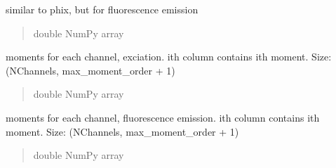 \documentclass[letterpaper,10pt,english]{sphinxmanual}
\begin{document}
\begin{fulllineitems}

\begin{fulllineitems}
\label{\detokenize{_autosummary/nirfasterff.base.data.flTRMomentsdata:nirfasterff.base.data.flTRMomentsdata.phifl}}
\pysigstartsignatures
{}
\pysigstopsignatures
\sphinxAtStartPar
similar to phix, but for fluorescence emission
\begin{quote}\begin{description}
\sphinxAtStartPar
double NumPy array

\end{description}\end{quote}

\end{fulllineitems}


\begin{fulllineitems}
\label{\detokenize{_autosummary/nirfasterff.base.data.flTRMomentsdata:nirfasterff.base.data.flTRMomentsdata.momentsx}}
\pysigstartsignatures
{}
\pysigstopsignatures
\sphinxAtStartPar
moments for each channel, exciation. i\sphinxhyphen{}th column contains i\sphinxhyphen{}th moment. Size: (NChannels, max\_moment\_order + 1)
\begin{quote}\begin{description}
\sphinxAtStartPar
double NumPy array

\end{description}\end{quote}

\end{fulllineitems}


\begin{fulllineitems}
\label{\detokenize{_autosummary/nirfasterff.base.data.flTRMomentsdata:nirfasterff.base.data.flTRMomentsdata.momentsfl}}
\pysigstartsignatures
{}
\pysigstopsignatures
\sphinxAtStartPar
moments for each channel, fluorescence emission. i\sphinxhyphen{}th column contains i\sphinxhyphen{}th moment. Size: (NChannels, max\_moment\_order + 1)
\begin{quote}\begin{description}
\sphinxAtStartPar
double NumPy array


\end{description}
\end{quote}
\end{fulllineitems}
\end{fulllineitems}
\end{document}
